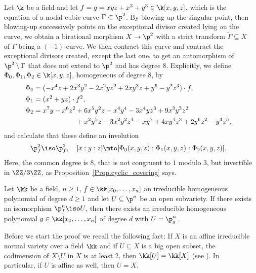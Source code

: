 \begin{example}
Let $\k$ be a field and let $f=g=xyz+x^3+y^3\in \k[x,y,z]$, which is the equation of a nodal cubic curve $\Gamma\subset\p^2$. By blowing-up the singular point, then blowing-up successively points on the exceptional divisor created lying on the curve, we obtain a birational morphism $X\to\p^2$ with a strict transform $\tilde{\Gamma}\subseteq X$
of $\Gamma$ being a $(-1)$-curve. We then contract this curve and contract the exceptional divisors created, except the last one, to get an automorphism of $\p^2\setminus \Gamma$ that does not extend to $\p^2$ and has degree $8$. Explicitly, we define $\Phi_0,\Phi_1,\Phi_2\in \k[x,y,z]$, homogeneous of degree $8$, by
\begin{align*}
\Phi_0 & = (-x^4z + 2x^3y^2 - 2x^2yz^2 + 2xy^3z + y^5 - y^2z^3)\cdot f, \\
\Phi_1 & = (x^2+yz)\cdot f^2, \\
\Phi_2 &=
x^7 y -x^6 z^2+6 x^5 y^2z-x^4 y^4-3 x^4 yz^3 +9 x^3 y^3z^2 \\
&\hspace*{2.14cm} + x^2y^5 z-3 x^2 y^2z^4 - x y^7+4 x y^4z^3 +2 y^6z^2- y^3z^5,
\end{align*}
and calculate that these define an involution
\[
\p^2_f\iso \p^2_f, \quad [x:y:z]\mto [\Phi_0(x,y,z):\Phi_1(x,y,z):\Phi_2(x,y,z)].
\]
Here, the common degree is $8$, that is not congruent to $1$ modulo $3$, but invertible in $\ZZ/3\ZZ$, as Proposition~\ref{Prop.cyclic_covering} says.
\end{example}

\begin{lemma}
\label{Lem.Open_iso_to_Pn_g}
Let $\kk$ be a field, $n\ge 1$, $f \in \kk[x_0, \ldots, x_n]$ an irreducible homogeneous polynomial of degree $d \geq 1$
and let $U \subseteq \p^n$ be an open subvariety.
If there exists an isomorphism $\p^n_f \iso U$, then there exists an irreducible homogeneous polynomial $g \in \kk[x_0, \ldots, x_n]$ of degree $d$ with $U = \p^n_g$.
\end{lemma}

Before we start the proof we recall the following fact: If $X$ is an affine irreducible
normal variety over a field $\kk$ and if $U \subseteq X$ is a big open subset, \ie the codimension of $X \setminus U$ in $X$ is at least $2$,
then $\kk[U] = \kk[X]$ (see \cite[Th.\,11.5]{Ma1986Commutative-ring-t}). In particular, if $U$ is affine as well, then $U = X$.

